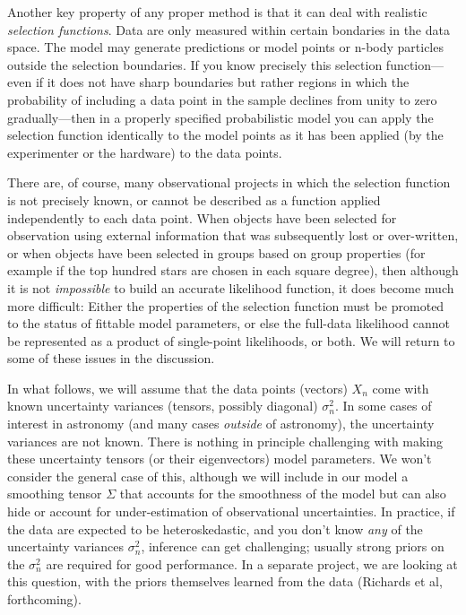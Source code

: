 \documentclass[12pt,pdftex,preprint]{aastex}
\begin{document}
Another key property of any proper method is that it can deal with
realistic \emph{selection functions}.
Data are only measured within certain bondaries in the data space.
The model may generate predictions or model points or n-body
particles outside the selection boundaries.
If you know precisely this selection function---even if it does
not have sharp boundaries but rather regions in which the
probability of including a data point in the sample declines from
unity to zero gradually---then in a properly specified probabilistic
model you can apply the selection function identically to the model
points as it has been applied (by the experimenter or the hardware)
to the data points.

There are, of course, many observational projects in which the
selection function is not precisely known, or cannot be described
as a function applied independently to each data point.
When objects have been selected for observation using external
information that was subsequently lost or over-written, or when
objects have been selected in groups based on group properties
(for example if the top hundred stars are chosen in each square
degree), then although it is not \emph{impossible} to build an
accurate likelihood function, it does become much more difficult:
Either the properties of the selection function must be promoted
to the status of fittable model parameters, or else the full-data
likelihood cannot be represented as a product of single-point
likelihoods, or both.  We will return to some of these issues in
the discussion.

In what follows, we will assume that the data points (vectors) $X_n$
come with known uncertainty variances (tensors, possibly diagonal)
$\sigma^2_n$.  In some cases of interest in astronomy (and many cases
\emph{outside} of astronomy), the uncertainty variances are not known.
There is nothing in principle challenging with making these
uncertainty tensors (or their eigenvectors) model parameters.  We
won't consider the general case of this, although we will include in
our model a smoothing tensor $\Sigma$ that accounts for the smoothness
of the model but can also hide or account for under-estimation of
observational uncertainties.  In practice, if the data are expected to
be heteroskedastic, and you don't know \emph{any} of the uncertainty
variances $\sigma^2_n$, inference can get challenging; usually strong
priors on the $\sigma^2_n$ are required for good performance.  In a
separate project, we are looking at this question, with the priors
themselves learned from the data (Richards et al, forthcoming).
\end{document}
